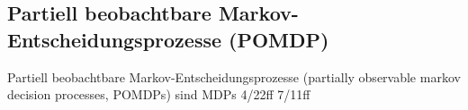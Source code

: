 







\subsection{Partiell beobachtbare Markov-Entscheidungsprozesse (POMDP)}
Partiell beobachtbare Markov-Entscheidungsprozesse (partially observable markov decision processes, POMDPs) sind MDPs
4/22ff
7/11ff

